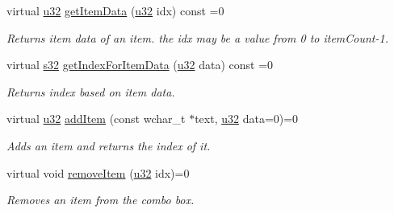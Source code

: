 \begin{DoxyCompactItemize}
\mbox{\label{classirr_1_1gui_1_1IGUIComboBox_ac0f2189cf87e4ffe38834edea01c75fb}} 
virtual \hyperlink{namespaceirr_a0416a53257075833e7002efd0a18e804}{u32} \hyperlink{classirr_1_1gui_1_1IGUIComboBox_ac0f2189cf87e4ffe38834edea01c75fb}{get\+Item\+Data} (\hyperlink{namespaceirr_a0416a53257075833e7002efd0a18e804}{u32} idx) const =0
\begin{DoxyCompactList}\small\item\em Returns item data of an item. the idx may be a value from 0 to item\+Count-\/1. \end{DoxyCompactList}\item 
\mbox{\label{classirr_1_1gui_1_1IGUIComboBox_a01c1dea5455f7a9302cea8d156787c3e}} 
virtual \hyperlink{namespaceirr_ac66849b7a6ed16e30ebede579f9b47c6}{s32} \hyperlink{classirr_1_1gui_1_1IGUIComboBox_a01c1dea5455f7a9302cea8d156787c3e}{get\+Index\+For\+Item\+Data} (\hyperlink{namespaceirr_a0416a53257075833e7002efd0a18e804}{u32} data) const =0
\begin{DoxyCompactList}\small\item\em Returns index based on item data. \end{DoxyCompactList}\item 
\mbox{\label{classirr_1_1gui_1_1IGUIComboBox_a1952afb705f497306cb006c502ac181c}} 
virtual \hyperlink{namespaceirr_a0416a53257075833e7002efd0a18e804}{u32} \hyperlink{classirr_1_1gui_1_1IGUIComboBox_a1952afb705f497306cb006c502ac181c}{add\+Item} (const wchar\+\_\+t $\ast$text, \hyperlink{namespaceirr_a0416a53257075833e7002efd0a18e804}{u32} data=0)=0
\begin{DoxyCompactList}\small\item\em Adds an item and returns the index of it. \end{DoxyCompactList}\item 
virtual void \hyperlink{classirr_1_1gui_1_1IGUIComboBox_aa6a351f80aa57374459a9d66f416ce3c}{remove\+Item} (\hyperlink{namespaceirr_a0416a53257075833e7002efd0a18e804}{u32} idx)=0
\begin{DoxyCompactList}\small\item\em Removes an item from the combo box. \end{DoxyCompactList}\item 
\mbox{\label{classirr_1_1gui_1_1IGUIComboBox_af9f5d813496af19af437a6f51fa7e029}} 

\end{DoxyCompactItemize}
